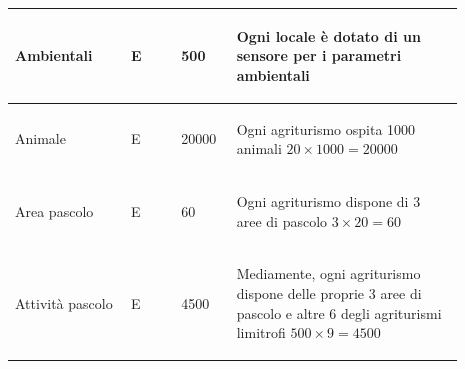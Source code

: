 \documentclass[12pt,a4paper]{article}
\begin{document}
\begin{center}
\begin{longtable}{|p{0.23\linewidth}|p{0.1\linewidth}|p{0.11\linewidth}|p{0.45\linewidth}|}
\hline
Ambientali 				& \begin{center}
\vspace{-25pt}E
\end{center}
					& \begin{center}
					\vspace{-25pt}500\end{center}
					& \begin{flushleft}\vspace{-25pt} Ogni locale è dotato di un sensore per i parametri ambientali \end{flushleft}\\ 

\hline
Animale 				& \begin{center}
\vspace{-25pt}E
\end{center}
					& \begin{center}
					\vspace{-25pt}20000\end{center}
					& \begin{flushleft}\vspace{-25pt} Ogni agriturismo ospita 1000 animali $20\times 1000=20000$ \end{flushleft}\\ 

\hline
Area pascolo 				& \begin{center}
\vspace{-25pt}E
\end{center}
					& \begin{center}
					\vspace{-25pt}60\end{center}
					& \begin{flushleft}\vspace{-25pt} Ogni agriturismo dispone di 3 aree di pascolo $3\times 20= 60$\end{flushleft}\\ 

\hline
Attività pascolo 				& \begin{center}
\vspace{-25pt}E
\end{center}
					& \begin{center}
					\vspace{-25pt}4500\end{center}
					& \begin{flushleft}\vspace{-25pt} Mediamente, ogni agriturismo dispone delle proprie 3 aree di pascolo e altre 6 degli agriturismi limitrofi $500\times 9 = 4500$\end{flushleft}\\ 


\end{longtable}
\end{center}
\end{document}
